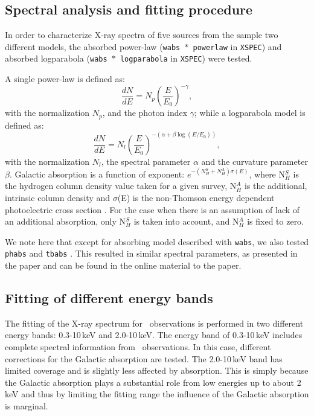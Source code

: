 \subsection{Spectral analysis and fitting procedure} \label{fitting}
In order to characterize X-ray spectra of five sources from the sample two different models, the absorbed power-law (\texttt{wabs\,$*$\,powerlaw} in \verb|XSPEC|) and absorbed logparabola (\texttt{wabs\,$*$\,logparabola} in \verb|XSPEC|) were tested.

A single power-law is  defined as:
\begin{equation}
 \frac{dN}{dE}=N_p  \left( \frac{E}{E_0}\right)^{-{\gamma}},
\end{equation}
with the normalization $N_p$, and the photon index $\gamma$;
while a logparabola model is defined as:
\begin{equation}
 \frac{dN}{dE}=N_l  \left( \frac{E}{E_0}\right)^{-({\alpha+\beta \log (E/E_0)})},
\end{equation}
 with the normalization $N_l$, the spectral parameter $\alpha$ and the curvature parameter $\beta$. 
 Galactic absorption is a function of exponent:  $ e^{-(N_{H}^{S}+N_{H}^{A})\sigma (E)}$, where  N$_{H}^{S}$ is the hydrogen column density value taken for a given survey,  N$_{H}^{A}$ is the additional, intrinsic column density  and $\sigma$(E) is the non-Thomson  energy dependent photoelectric  cross section \citep{Morrison83}.
 For the case when there is an assumption of lack of an additional absorption, only N$_{H}^{S}$ is taken into account, and N$_{H}^{A}$ is fixed to zero. 

We note here that except for absorbing model described with \texttt{wabs}, we also tested \texttt{phabs} and \texttt{tbabs} \citep{wabsy}.
This resulted in similar spectral parameters, as presented in the paper and can be found in the online material to the paper. 



\subsection{Fitting of different energy bands}
The fitting of the X-ray spectrum for \xrt\ observations is performed in two different energy bands: 0.3-10\,keV and 2.0-10\,keV. 
The energy band of 0.3-10\,keV includes complete spectral information from \xrt\ observations.
In this case, different corrections for the Galactic absorption are tested. 
The 2.0-10\,keV band has limited coverage and is slightly less affected by absorption. 
This is simply because the Galactic absorption plays a substantial role from low energies up to about 2\,keV \citep[e.g.][]{Campana2014} and thus by limiting the fitting range the influence of the Galactic absorption is marginal.



